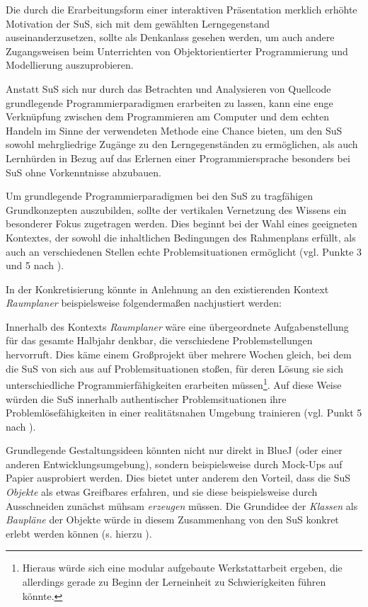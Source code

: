 \documentclass[paper=a4, DIV=13, BCOR=12mm, twoside=on, onecolumn=on, open = any, titlepage =on, parskip =half-, headsepline = on, footsepline = on, chapterprefix = on, sectionprefix = on, appendixprefix = off, fontsize = 12pt, numbers = noenddot, abstract = off]{scrreprt}
\begin{document}
Die durch die Erarbeitungsform einer interaktiven Präsentation merklich erhöhte Motivation der SuS, sich mit dem gewählten Lerngegenstand auseinanderzusetzen, sollte als Denkanlass gesehen werden, um auch andere Zugangsweisen beim Unterrichten von Objektorientierter Programmierung und Modellierung auszuprobieren.

Anstatt SuS sich nur durch das Betrachten und Analysieren von Quellcode grundlegende Programmierparadigmen erarbeiten zu lassen, kann eine enge Verknüpfung zwischen dem Programmieren am Computer und dem echten Handeln im Sinne der verwendeten Methode eine Chance bieten, um den SuS sowohl mehrgliedrige Zugänge zu den Lerngegenständen zu ermöglichen, als auch Lernhürden in Bezug auf das Erlernen einer Programmiersprache besonders bei SuS ohne Vorkenntnisse abzubauen.

Um grundlegende Programmierparadigmen bei den SuS zu tragfähigen Grundkonzepten auszubilden, sollte der vertikalen Vernetzung des Wissens ein besonderer Fokus zugetragen werden. Dies beginnt bei der Wahl eines geeigneten Kontextes, der sowohl die inhaltlichen Bedingungen des Rahmenplans erfüllt, als auch an verschiedenen Stellen echte Problemsituationen ermöglicht (vgl. Punkte 3 und 5 nach \cite[S.67]{hubwieser:07}). 


In der Konkretisierung könnte in Anlehnung an den existierenden Kontext \textit{Raumplaner} beispielsweise folgendermaßen nachjustiert werden:

Innerhalb des Kontexts \emph{Raumplaner} wäre eine übergeordnete Aufgabenstellung für das gesamte Halbjahr denkbar, die verschiedene Problemstellungen hervorruft. Dies käme einem Großprojekt über mehrere Wochen gleich, bei dem die SuS von sich aus auf Problemsituationen stoßen, für deren Lösung sie sich unterschiedliche Programmierfähigkeiten erarbeiten müssen\footnote{Hieraus würde sich eine modular aufgebaute Werkstattarbeit ergeben, die allerdings gerade zu Beginn der Lerneinheit zu Schwierigkeiten führen könnte.}. Auf diese Weise würden die SuS innerhalb authentischer Problemsituationen ihre Problemlösefähigkeiten in einer realitätsnahen Umgebung trainieren (vgl. Punkt 5 nach \cite[S.67]{hubwieser:07}).

Grundlegende Gestaltungsideen könnten nicht nur direkt in BlueJ (oder einer anderen Entwicklungsumgebung), sondern beispielsweise durch Mock-Ups auf Papier ausprobiert werden. Dies bietet unter anderem den Vorteil, dass die SuS \emph{Objekte} als etwas Greifbares erfahren, und sie diese beispielsweise durch Ausschneiden zunächst mühsam \emph{erzeugen} müssen. Die Grundidee der \emph{Klassen} als \emph{Baupläne} der Objekte würde in diesem Zusammenhang von den SuS konkret erlebt werden können (s. hierzu \cite[S.109]{aebli:11}).
\end{document}
